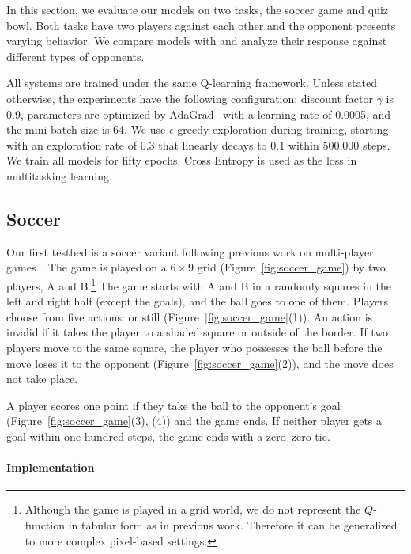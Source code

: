 In this section, we evaluate our models on two tasks, the soccer game
and quiz bowl.  Both tasks have two players against each other and the
opponent presents varying behavior.  We compare \dron{} models with
\dqn{} and analyze their response against different types of
opponents.

All systems are trained under the same Q-learning framework.  Unless
stated otherwise, the experiments have the following
configuration: discount factor $\gamma$ is 0.9, parameters are optimized by AdaGrad~\cite{duchi2011adaptive} with a learning rate of 0.0005, and the mini-batch size is 64.  We use
$\epsilon$-greedy exploration during training, starting with an
exploration rate of 0.3 that linearly decays to 0.1 within 500,000
steps.  We train all models for fifty epochs.
Cross Entropy is used as the loss in multitasking learning.

\subsection{Soccer}

Our first testbed is a soccer variant following previous work on
multi-player
games~\cite{minimax-q,collins-thesis-rl,opponent-qlearning}.  The game
is played on a $6\times 9$ grid (Figure~\ref{fig:soccer_game}) by two
players, A and B.\footnote{Although the game is played in a grid
  world, we do not represent the $Q$-function in tabular form as in
  previous work. Therefore it can be generalized to more complex
  pixel-based settings.}  The game starts with A and B in a
randomly squares in the left and right half (except the
goals), and the ball goes to one of them.  Players choose
from five actions:  or  still
(Figure~\ref{fig:soccer_game}(1)).  An action is invalid if it takes
the player to a shaded square or outside of the border.  If two
players move to the same square, the player who possesses the ball
before the move loses it to the opponent
(Figure~\ref{fig:soccer_game}(2)), and the move does not take place.


A player scores one point if they take the ball
to the opponent's goal (Figure~\ref{fig:soccer_game}(3), (4)) and the
game ends.  If neither player gets a goal within one hundred steps,
the game ends with a zero--zero tie.

\paragraph{Implementation}

